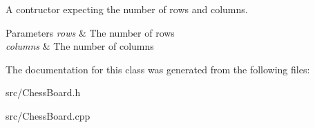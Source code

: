 A contructor expecting the number of rows and columns. 


\begin{DoxyParams}{Parameters}
{\em rows} & The number of rows \\
\hline
{\em columns} & The number of columns \\
\hline
\end{DoxyParams}


The documentation for this class was generated from the following files\+:\begin{DoxyCompactItemize}
\item 
src/Chess\+Board.\+h\item 
src/Chess\+Board.\+cpp\end{DoxyCompactItemize}
